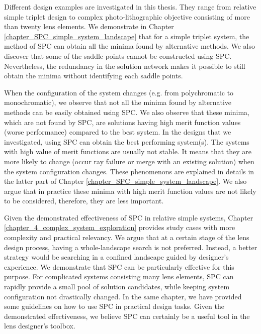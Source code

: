Different design examples are investigated in this thesis. They range from relative simple triplet design to complex photo-lithographic objective consisting of more than twenty lens elements. We demonstrate in Chapter \ref{chapter_SPC_simple_system_landscape} that for a simple triplet system, the method of SPC can obtain all the minima found by alternative methods. We also discover that some of the saddle points cannot be constructed using SPC. Nevertheless, the redundancy in the solution network makes it possible to still obtain the minima without identifying each saddle points. 

When the configuration of the system changes (e.g. from polychromatic to monochromatic), we observe that not all the minima found by alternative methods can be easily obtained using SPC. We also observe that these minima, which are not found by SPC, are solutions having high merit function values (worse performance) compared to the best system. In the designs that we investigated, using SPC can obtain the best performing system(s). The systems with high value of merit functions are usually not stable. It means that they are more likely to change (occur ray failure or merge with an existing solution) when the system configuration changes. These phenomenons are explained in details in the latter part of Chapter \ref{chapter_SPC_simple_system_landscape}. We also argue that in practice these minima with high merit function values are not likely to be considered, therefore, they are less important.   

Given the demonstrated effectiveness of SPC in relative simple systems, Chapter \ref{chapter_4_complex_system_exploration} provides study cases with more complexity and practical relevancy. We argue that at a certain stage of the lens design process, having a whole-landscape search is not preferred. Instead, a better strategy would be searching in a confined landscape guided by designer's experience. We demonstrate that SPC can be particularly effective for this purpose. For complicated systems consisting many lens elements, SPC can rapidly provide a small pool of solution candidates, while keeping system configuration not drastically changed. In the same chapter, we have provided some guidelines on how to use SPC in practical design tasks. Given the demonstrated effectiveness, we believe SPC can certainly be a useful tool in the lens designer's toolbox. 

